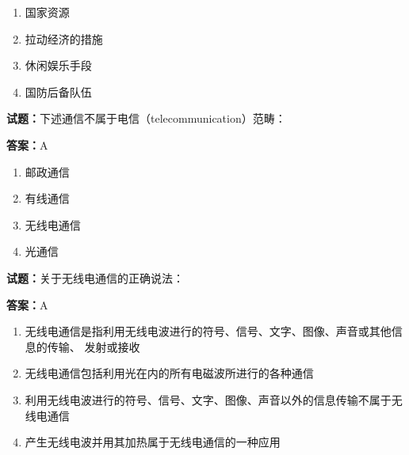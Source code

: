 \documentclass{ctexbook}
\begin{document}
\begin{enumerate}[leftmargin=3em]
  \item 国家资源 

  \item 拉动经济的措施 

  \item 休闲娱乐手段 

  \item 国防后备队伍 

\end{enumerate}





\vspace{1em}

\textbf{试题：}下述通信不属于电信（telecommunication）范畴： 

\textbf{答案：}A 

\begin{enumerate}[leftmargin=3em]
  \item 邮政通信 

  \item 有线通信 

  \item 无线电通信 

  \item 光通信 

\end{enumerate}





\vspace{1em}

\textbf{试题：}关于无线电通信的正确说法： 

\textbf{答案：}A 

\begin{enumerate}[leftmargin=3em]
  \item 无线电通信是指利用无线电波进行的符号、信号、文字、图像、声音或其他信息的传输、
发射或接收 

  \item 无线电通信包括利用光在内的所有电磁波所进行的各种通信 

  \item 利用无线电波进行的符号、信号、文字、图像、声音以外的信息传输不属于无线电通信 

  \item 产生无线电波并用其加热属于无线电通信的一种应用 

\end{enumerate}
\end{document}
